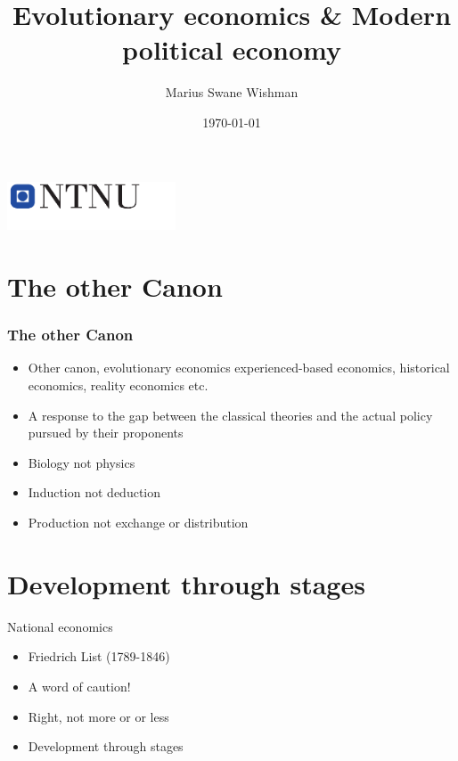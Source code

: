 \documentclass{beamer}
\title[POL2012]{Evolutionary economics \& Modern political economy}
\subtitle{}
\author[Wishman]{Marius Swane Wishman}
\date{\today}
\institute{ISS}
\begin{document}
\begin{frame}[plain]
\titlepage 
\centering
\includegraphics[width=5cm]{logo_ntnu_u-slagord.pdf} 
\end{frame}


\section{The other Canon} 

\begin{frame}
\frametitle{The other Canon}

\begin{itemize}
	\item Other canon, evolutionary economics experienced-based economics,
		historical economics, reality economics etc.
	\item A response to the gap between the classical theories and the
		actual policy pursued by their proponents\pause
	\item Biology not physics \pause
	\item Induction not deduction \pause
	\item Production not exchange or distribution
\end{itemize}
	
\end{frame}

\section{Development through stages}

\begin{frame}{National economics}

\begin{itemize}
	\item Friedrich List (1789-1846)
	\item A word of caution! \pause
	\item Right, not more or or less
	\item Development through stages %
\end{itemize}	

\end{frame}
\end{document}
